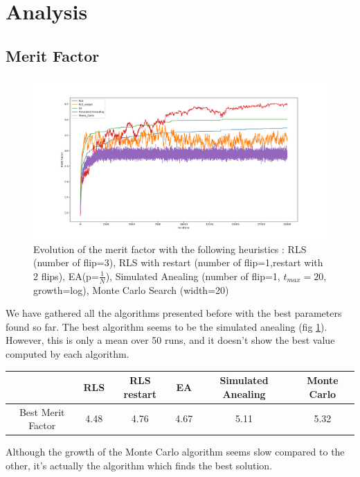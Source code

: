 \documentclass[a4paper,11pt,openany]{article}
\begin{document}
\section{Analysis}
\subsection{Merit Factor}
\begin{figure}[H]
\begin{center}
\includegraphics[scale=0.35]{Images/all_results}
\caption{Evolution of the merit factor with the following heuristics : RLS (number of flip=3), RLS with restart (number of flip=1,restart with 2 flips), EA(p=$\frac{1}{N}$), Simulated Anealing (number of flip=1, $t_{max}=20$, growth=log), Monte Carlo Search (width=20)}
\label{fig:all_results}
\end{center}
\end{figure}
\noindent
We have gathered all the algorithms presented before with the best parameters found so far. The best algorithm seems to be the simulated anealing (fig \ref{fig:all_results}). However, this is only a mean over 50 runs, and it doesn't show the best value computed by each algorithm.\\
\begin{center}
\begin{tabular}{|c|c|c|c|c|c|}
\hline
  & RLS & RLS restart & EA & Simulated Anealing & Monte Carlo \\
\hline
Best Merit Factor & 4.48 & 4.76 & 4.67 & 5.11 & 5.32\\
\hline
\end{tabular}
\end{center}
Although the growth of the Monte Carlo algorithm seems slow compared to the other, it's actually the algorithm which finds the best solution.
\end{document}
